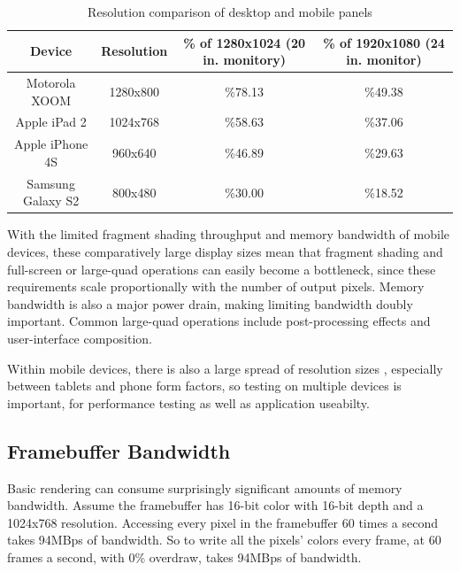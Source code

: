 \begin{table}[htb]\centering \begin{tabular}{|c||c|c|c|} 
\hline \small{Device} & \small{Resolution} & \small{\% of 1280x1024 (20 in. monitory)} & \small{\% of 1920x1080 (24 in. monitor)}  \\ \hline 
\hline \small{Motorola XOOM} & \small{1280x800} & \small{\%78.13} & \small{\%49.38}\\ 
\hline \small{Apple iPad 2} & \small{1024x768} & \small{\%58.63} & \small{\%37.06}\\ 
\hline \small{Apple iPhone 4S} & \small{960x640} & \small{\%46.89} & \small{\%29.63}\\
\hline \small{Samsung Galaxy S2} & \small{800x480} & \small{\%30.00} & \small{\%18.52}\\ \hline
\end{tabular} 
\caption{Resolution comparison of desktop and mobile panels} 
\label{JonMcCaffrey:resolutions} \end{table}


With the limited fragment shading throughput and memory bandwidth of mobile
devices, these comparatively large display sizes mean that fragment shading and
full-screen or large-quad operations can easily become a bottleneck, since
these requirements scale proportionally with the number of output pixels.
Memory bandwidth is also a major power drain, making limiting bandwidth doubly
important.  Common large-quad operations include post-processing effects and user-interface composition.

Within mobile devices, there is also a large spread of resolution sizes
, especially between tablets and phone form factors, so testing
on multiple devices is important, for performance testing as well as
application useabilty.

\subsection{Framebuffer Bandwidth}\label{Jon-McCaffrey-Framebuffer-Bandwidth}

Basic rendering can consume surprisingly significant amounts of memory
bandwidth.  Assume the framebuffer has 16-bit color with 16-bit depth
\cite{Google11} and a 1024x768 resolution.  Accessing every pixel in the
framebuffer 60 times a second takes 94MBps of bandwidth.  So to write all the
pixels' colors every frame, at 60 frames a second, with 0\%
overdraw, takes 94MBps of bandwidth.

